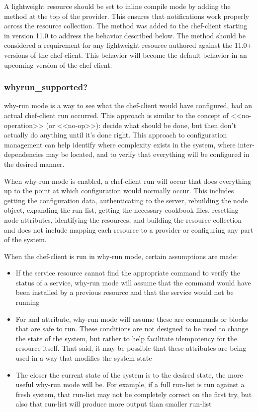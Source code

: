 A lightweight resource should be set to inline compile mode by adding the  method at the top of the provider. This ensures that notifications work properly across the resource collection. The  method was added to the chef-client starting in version 11.0 to address the behavior described below. The  method should be considered a requirement for any lightweight resource authored against the 11.0+ versions of the chef-client. This behavior will become the default behavior in an upcoming version of the chef-client.

\subsubsection{whyrun\_supported?}

why-run mode is a way to see what the chef-client would have configured, had an actual chef-client run occurred. This approach is similar to the concept of <<no-operation>> (or <<no-op>>): decide what should be done, but then don't actually do anything until it's done right. This approach to configuration management can help identify where complexity exists in the system, where inter-dependencies may be located, and to verify that everything will be configured in the desired manner.

When why-run mode is enabled, a chef-client run will occur that does everything up to the point at which configuration would normally occur. This includes getting the configuration data, authenticating to the server, rebuilding the node object, expanding the run list, getting the necessary cookbook files, resetting node attributes, identifying the resources, and building the resource collection and does not include mapping each resource to a provider or configuring any part of the system.

When the chef-client is run in why-run mode, certain assumptions are made:

\begin{itemize}
  \item If the service resource cannot find the appropriate command to verify the status of a service, why-run mode will assume that the command would have been installed by a previous resource and that the service would not be running
  \item For  and  attribute, why-run mode will assume these are commands or blocks that are safe to run. These conditions are not designed to be used to change the state of the system, but rather to help facilitate idempotency for the resource itself. That said, it may be possible that these attributes are being used in a way that modifies the system state
  \item The closer the current state of the system is to the desired state, the more useful why-run mode will be. For example, if a full run-list is run against a fresh system, that run-list may not be completely correct on the first try, but also that run-list will produce more output than smaller run-list
\end{itemize}

